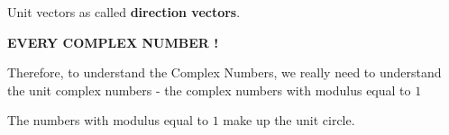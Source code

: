 \documentclass{ximera}
\begin{document}
Unit vectors as called \textbf{direction vectors}.



\begin{center}

\textbf{\Huge{\textcolor{purple!50!blue!90!black}{EVERY COMPLEX NUMBER !}}}

\end{center}



Therefore, to understand the Complex Numbers, we really need to understand the unit complex numbers - the complex numbers with modulus equal to $1$



The numbers with modulus equal to $1$ make up the unit circle.
\end{document}
